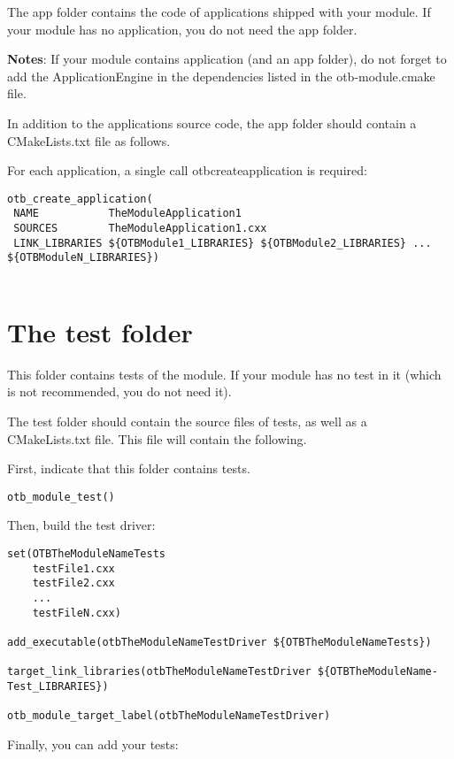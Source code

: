 The app folder contains the code of applications shipped with your module. If your module has no application, you do not need the app folder.

\textbf{Notes}: If your module contains application (and an app folder), do not forget to add the ApplicationEngine in the dependencies listed in the otb-module.cmake file.

In addition to the applications source code, the app folder should contain a CMakeLists.txt file as follows.

For each application, a single call otb\textunderscore create\textunderscore application is required: 

\begin{verbatim}
otb_create_application(
 NAME           TheModuleApplication1
 SOURCES        TheModuleApplication1.cxx
 LINK_LIBRARIES ${OTBModule1_LIBRARIES} ${OTBModule2_LIBRARIES} ... ${OTBModuleN_LIBRARIES})
 
\end{verbatim}

\section{The test folder }

This folder contains tests of the module. If your module has no test in it (which is not recommended, you do not need it).

The test folder should contain the source files of tests, as well as a CMakeLists.txt file. This file will contain the following.

First, indicate that this folder contains tests. 

\begin{verbatim}
otb_module_test()
\end{verbatim}

Then, build the test driver: 

\begin{verbatim}
set(OTBTheModuleNameTests
    testFile1.cxx
    testFile2.cxx
    ...
    testFileN.cxx)

add_executable(otbTheModuleNameTestDriver ${OTBTheModuleNameTests})

target_link_libraries(otbTheModuleNameTestDriver ${OTBTheModuleName-Test_LIBRARIES})
 
otb_module_target_label(otbTheModuleNameTestDriver)
\end{verbatim}

Finally, you can add your tests: 

